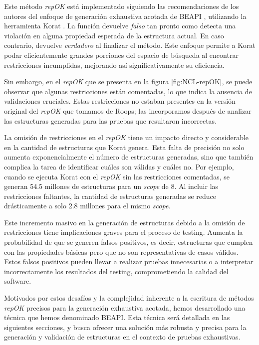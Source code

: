 Este método \emph{repOK} está implementado siguiendo las recomendaciones de los
autores del enfoque de generación exhaustiva acotada de BEAPI , utilizando la herramienta \textsf{Korat} \cite{Boyapati02}. 
La función devuelve \emph{falso} tan pronto como detecta una violación en alguna propiedad esperada de la estructura actual. 
En caso contrario, devuelve \emph{verdadero} al finalizar el método. 
Este enfoque permite a \textsf{Korat} podar eficientemente grandes porciones del espacio de búsqueda al encontrar restricciones incumplidas, mejorando así significativamente su eficiencia.

Sin embargo, en el \emph{repOK} que se presenta en la figura \ref{fig:NCL-repOK}, 
se puede observar que algunas restricciones están comentadas, 
lo que indica la ausencia de validaciones cruciales. 
Estas restricciones no estaban presentes en la versión original del \emph{repOK} que tomamos de Roops; 
las incorporamos después de analizar las estructuras generadas para las pruebas que resultaron incorrectas.

La omisión de restricciones en el \emph{repOK} tiene un impacto directo y considerable en la cantidad de estructuras que \textsf{Korat} genera. 
Esta falta de precisión no solo aumenta exponencialmente el número de estructuras generadas, 
sino que también complica la tarea de identificar cuáles son válidas y cuáles no. 
Por ejemplo, cuando se ejecuta \textsf{Korat} con el \emph{repOK} sin las restricciones comentadas, 
se generan 54.5 millones de estructuras para un \emph{scope} de 8. Al incluir las restricciones faltantes, 
la cantidad de estructuras generadas se reduce drásticamente a solo 2.8 millones para el mismo \emph{scope}.

Este incremento masivo en la generación de estructuras debido a la omisión de restricciones tiene implicaciones graves para el proceso de testing. 
Aumenta la probabilidad de que se generen falsos positivos, es decir, estructuras que cumplen con las propiedades básicas pero que no son representativas de casos válidos. 
Estos falsos positivos pueden llevar a realizar pruebas innecesarias o a interpretar incorrectamente los resultados del testing, comprometiendo la calidad del software.

Motivados por estos desafíos y la complejidad inherente a la escritura de métodos \emph{repOK} precisos para la generación exhaustiva acotada, hemos desarrollado una técnica que hemos denominado BEAPI. 
Esta técnica será detallada en las siguientes secciones, y busca ofrecer una solución más robusta y precisa para la generación y validación de estructuras en el contexto de pruebas exhaustivas.


